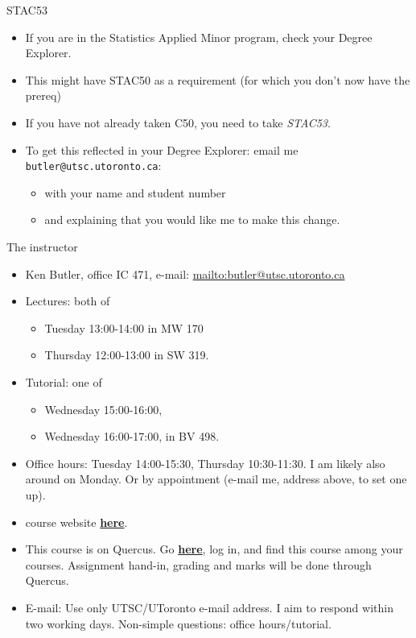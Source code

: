 \documentclass[ignorenonframetext,]{beamer}
\providecommand{\tightlist}{%
  \setlength{\itemsep}{0pt}\setlength{\parskip}{0pt}}
\begin{document}
\begin{frame}[fragile]{STAC53}
\protect\hypertarget{stac53}{}

\begin{itemize}
\tightlist
\item
  If you are in the Statistics Applied Minor program, check your Degree
  Explorer.
\item
  This might have STAC50 as a requirement (for which you don't now have
  the prereq)
\item
  If you have not already taken C50, you need to take \emph{STAC53}.
\item
  To get this reflected in your Degree Explorer: email me
  \texttt{butler@utsc.utoronto.ca}:

  \begin{itemize}
  \tightlist
  \item
    with your name and student number
  \item
    and explaining that you would like me to make this change.
  \end{itemize}
\end{itemize}

\end{frame}

\begin{frame}{The instructor}
\protect\hypertarget{the-instructor}{}

\begin{itemize}
\tightlist
\item
  Ken Butler, office IC 471, e-mail:
  \url{mailto:butler@utsc.utoronto.ca}
\item
  Lectures: both of

  \begin{itemize}
  \tightlist
  \item
    Tuesday 13:00-14:00 in MW 170
  \item
    Thursday 12:00-13:00 in SW 319.
  \end{itemize}
\item
  Tutorial: one of

  \begin{itemize}
  \tightlist
  \item
    Wednesday 15:00-16:00,
  \item
    Wednesday 16:00-17:00, in BV 498.
  \end{itemize}
\item
  Office hours: Tuesday 14:00-15:30, Thursday 10:30-11:30. I am likely
  also around on Monday. Or by appointment (e-mail me, address above, to
  set one up).
\item
  course website \href{http://ritsokiguess.site/STAC32}{\textbf{here}}.
\item
  This course is on Quercus. Go
  \href{http://q.utoronto.ca}{\textbf{here}}, log in, and find this
  course among your courses. Assignment hand-in, grading and marks will
  be done through Quercus.
\item
  E-mail: Use only UTSC/UToronto e-mail address. I aim to respond within
  two working days. Non-simple questions: office hours/tutorial.
\end{itemize}

\end{frame}
\end{document}

